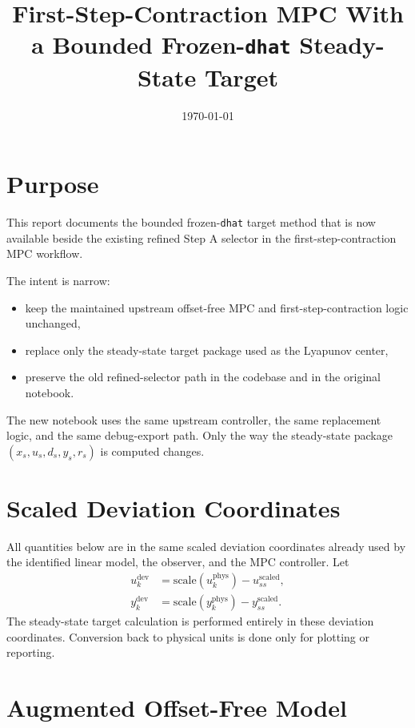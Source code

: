 \documentclass[11pt]{article}
\title{First-Step-Contraction MPC With a Bounded Frozen-\texttt{dhat} Steady-State Target}
\author{}
\date{\today}
\begin{document}
\maketitle

\section{Purpose}

This report documents the bounded frozen-\texttt{dhat} target method that is now available beside the existing refined Step A selector in the first-step-contraction MPC workflow.

The intent is narrow:
\begin{itemize}
\item keep the maintained upstream offset-free MPC and first-step-contraction logic unchanged,
\item replace only the steady-state target package used as the Lyapunov center,
\item preserve the old refined-selector path in the codebase and in the original notebook.
\end{itemize}

The new notebook uses the same upstream controller, the same replacement logic, and the same debug-export path. Only the way the steady-state package $(x_s,u_s,d_s,y_s,r_s)$ is computed changes.

\section{Scaled Deviation Coordinates}

All quantities below are in the same scaled deviation coordinates already used by the identified linear model, the observer, and the MPC controller. Let
\begin{align}
u_k^{\mathrm{dev}} &= \mathrm{scale}(u_k^{\mathrm{phys}}) - u_{ss}^{\mathrm{scaled}}, \\
y_k^{\mathrm{dev}} &= \mathrm{scale}(y_k^{\mathrm{phys}}) - y_{ss}^{\mathrm{scaled}}.
\end{align}
The steady-state target calculation is performed entirely in these deviation coordinates. Conversion back to physical units is done only for plotting or reporting.

\section{Augmented Offset-Free Model}
\end{document}
